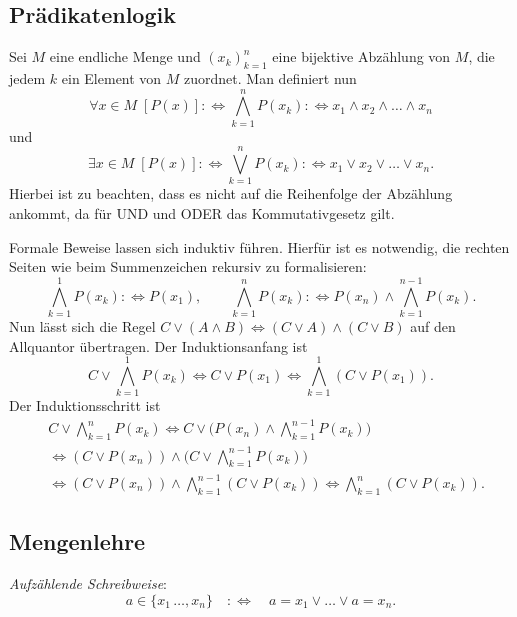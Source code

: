 \documentclass[a4paper,11pt,fleqn,twoside]{scrartcl}
\numberwithin{equation}{section}
\newcommand{\strong}[1]{{\sf\bfseries #1}}
\newenvironment{Definition}{\par\noindent\strong{Definition.}}{\par}
\newcommand{\emdef}[1]{\emph{#1}}
\begin{document}
\subsection{Prädikatenlogik}
Sei $M$ eine endliche Menge und $(x_k)_{k=1}^n$ eine bijektive
Abzählung von $M$, die jedem $k$ ein Element von $M$ zuordnet.
Man definiert nun
\begin{equation}
\forall x{\in}M\;[P(x)] :\Longleftrightarrow \bigwedge_{k=1}^n P(x_k) :\Longleftrightarrow x_1\land x_2\land\ldots\land x_n
\end{equation}
und
\begin{equation}
\exists x{\in}M\;[P(x)] :\Longleftrightarrow \bigvee_{k=1}^n P(x_k) :\Longleftrightarrow x_1\lor x_2\lor\ldots\lor x_n.
\end{equation}
Hierbei ist zu beachten, dass es nicht auf die Reihenfolge der
Abzählung ankommt, da für UND und ODER das Kommutativgesetz gilt.

Formale Beweise lassen sich induktiv führen. Hierfür ist es notwendig,
die rechten Seiten wie beim Summenzeichen rekursiv zu formalisieren:
\begin{equation}
\bigwedge_{k=1}^1 P(x_k) :\Longleftrightarrow P(x_1),\qquad
\bigwedge_{k=1}^n P(x_k) :\Longleftrightarrow P(x_n)\land\bigwedge_{k=1}^{n-1} P(x_k).
\end{equation}
Nun lässt sich die Regel $C\lor (A\land B)\iff (C\lor A)\land(C\lor B)$
auf den Allquantor übertragen. Der Induktionsanfang ist
\begin{equation}
C\lor\bigwedge_{k=1}^1 P(x_k) \iff C\lor P(x_1) \iff \bigwedge_{k=1}^1 (C\lor P(x_1)).
\end{equation}
Der Induktionsschritt ist
\begin{align}
& C\lor\!\bigwedge_{k=1}^n P(x_k)
\iff C\lor\bigg(P(x_n)\land\bigwedge_{k=1}^{n-1} P(x_k)\bigg)\\
&\iff (C\lor P(x_n))\land\bigg(C\lor\!\bigwedge_{k=1}^{n-1} P(x_k)\bigg)\\
&\iff (C\lor P(x_n))\land\bigwedge_{k=1}^{n-1} (C\lor P(x_k))
\iff \bigwedge_{k=1}^{n} (C\lor P(x_k)).
\end{align}
\subsection{Mengenlehre}

\begin{Definition}
\emdef{Aufzählende Schreibweise}:
\begin{equation}
a\in\{x_1\,\ldots,x_n\} \quad:\Longleftrightarrow\quad
a=x_1\lor\ldots\lor a=x_n.
\end{equation}
\end{Definition}
\end{document}
